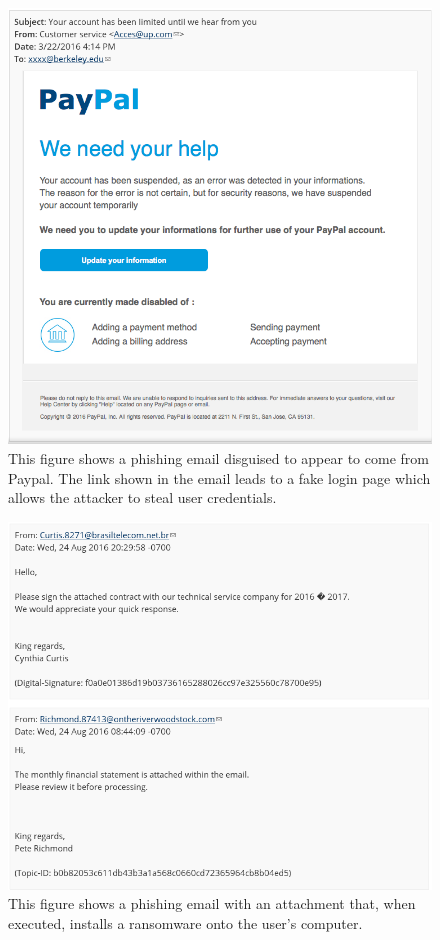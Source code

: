 \begin{figure}[p]
\centering
    \includegraphics[width=1.0\textwidth]{phishing_example_paypal.png}
    \caption{This figure shows a phishing email disguised to appear to come from Paypal. The link shown in the email leads to a fake login page which allows the attacker to steal user credentials.}
   \label{fig:phishing-example-paypal}
\end{figure}
\begin{figure}[p]
\centering
    \includegraphics[width=1.0\textwidth]{phishing_example_malware.png}
    \caption{This figure shows a phishing email with an attachment that, when executed, installs a ransomware onto the user's computer.}
   \label{fig:phishing-example-malware}
\end{figure}

